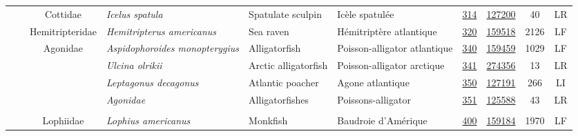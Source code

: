 \documentclass[12pt]{article}\usepackage[]{graphicx}\usepackage[]{color}
\begin{document}
\begin{landscapepage}
\begin{longtable}[t]{ccc>{\centering\arraybackslash}p{3cm}>{\centering\arraybackslash}p{3cm}>{\centering\arraybackslash}p{3cm}>{}c>{}ccc}
\nopagebreak
\hspace{1em}\hspace{1em} &  & Cottidae & \em{Icelus spatula} & Spatulate sculpin & Icèle spatulée & \href{#sec:314}{314} & \href{http://www.marinespecies.org/aphia.php?p=taxdetails&id=127200}{127200} & 40 & LR\\
\nopagebreak
\hspace{1em}\hspace{1em} &  & Hemitripteridae & \em{Hemitripterus americanus} & Sea raven & Hémitriptère atlantique & \href{#sec:320}{320} & \href{http://www.marinespecies.org/aphia.php?p=taxdetails&id=159518}{159518} & 2126 & LF\\
\nopagebreak
\hspace{1em}\hspace{1em} &  & Agonidae & \em{Aspidophoroides monopterygius} & Alligatorfish & Poisson-alligator atlantique & \href{#sec:340}{340} & \href{http://www.marinespecies.org/aphia.php?p=taxdetails&id=159459}{159459} & 1029 & LF\\
\nopagebreak
\hspace{1em}\hspace{1em} &  &  & \em{Ulcina olrikii} & Arctic alligatorfish & Poisson-alligator arctique & \href{#sec:341}{341} & \href{http://www.marinespecies.org/aphia.php?p=taxdetails&id=274356}{274356} & 13 & LR\\
\nopagebreak
\hspace{1em}\hspace{1em} &  &  & \em{Leptagonus decagonus} & Atlantic poacher & Agone atlantique & \href{#sec:350}{350} & \href{http://www.marinespecies.org/aphia.php?p=taxdetails&id=127191}{127191} & 266 & LI\\
\nopagebreak
\hspace{1em}\hspace{1em} &  &  & \em{Agonidae} & Alligatorfishes & Poissons-alligator & \href{#sec:351}{351} & \href{http://www.marinespecies.org/aphia.php?p=taxdetails&id=125588}{125588} & 43 & LR\\
\nopagebreak
\addlinespace[0.3em]
\\
\hspace{1em}\hspace{1em} &  & Lophiidae & \em{Lophius americanus} & Monkfish & Baudroie d'Amérique & \href{#sec:400}{400} & \href{http://www.marinespecies.org/aphia.php?p=taxdetails&id=159184}{159184} & 1970 & LF\\

\end{longtable}
\end{landscapepage}
\end{document}
